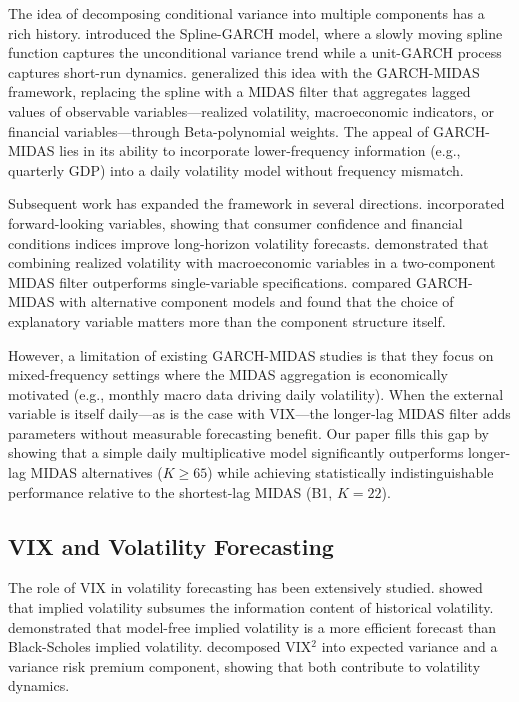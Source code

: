 \documentclass[12pt,a4paper]{article}
\begin{document}
The idea of decomposing conditional variance into multiple components has a rich history. \citet{engle2008} introduced the Spline-GARCH model, where a slowly moving spline function captures the unconditional variance trend while a unit-GARCH process captures short-run dynamics. \citet{engle2013} generalized this idea with the GARCH-MIDAS framework, replacing the spline with a MIDAS filter that aggregates lagged values of observable variables---realized volatility, macroeconomic indicators, or financial variables---through Beta-polynomial weights. The appeal of GARCH-MIDAS lies in its ability to incorporate lower-frequency information (e.g., quarterly GDP) into a daily volatility model without frequency mismatch.

Subsequent work has expanded the framework in several directions. \citet{conrad2015} incorporated forward-looking variables, showing that consumer confidence and financial conditions indices improve long-horizon volatility forecasts. \citet{conrad2020} demonstrated that combining realized volatility with macroeconomic variables in a two-component MIDAS filter outperforms single-variable specifications. \citet{wang2015} compared GARCH-MIDAS with alternative component models and found that the choice of explanatory variable matters more than the component structure itself.

However, a limitation of existing GARCH-MIDAS studies is that they focus on mixed-frequency settings where the MIDAS aggregation is economically motivated (e.g., monthly macro data driving daily volatility). When the external variable is itself daily---as is the case with VIX---the longer-lag MIDAS filter adds parameters without measurable forecasting benefit. Our paper fills this gap by showing that a simple daily multiplicative model significantly outperforms longer-lag MIDAS alternatives ($K \geq 65$) while achieving statistically indistinguishable performance relative to the shortest-lag MIDAS (B1, $K=22$).

\subsection{VIX and Volatility Forecasting}

The role of VIX in volatility forecasting has been extensively studied. \citet{christensen1998} showed that implied volatility subsumes the information content of historical volatility. \citet{jiang2005} demonstrated that model-free implied volatility is a more efficient forecast than Black-Scholes implied volatility. \citet{bekaert2014} decomposed VIX$^2$ into expected variance and a variance risk premium component, showing that both contribute to volatility dynamics.
\end{document}
